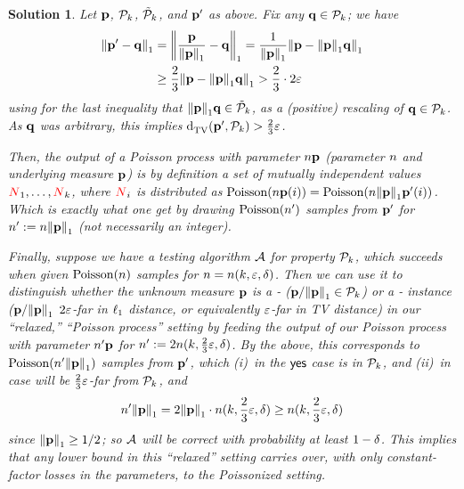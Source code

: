 \documentclass[biber,plain]{nowfnt} %
\newtheorem{solution}{Solution}[chapter]
\newcommand{\occur}{\textcolor{red}{N}}
\newcommand{\occur}{N}
\begin{document}
\begin{solution}
Let $\p$, $\property_\ab$, $\tilde{\property}_\ab$, and $\p'$ as above. Fix any $\q\in \property_\ab$; we have
\begin{align*}
\normone{\p' - \q}
&= \normone{\frac{\p}{\normone{\p}} - \q} 
= \frac{1}{\normone{\p}}\normone{\p - \normone{\p}\q} \\
&\geq \frac{2}{3}\normone{\p - \normone{\p}\q} > \frac{2}{3}\cdot 2\dst
\end{align*}
using for the last inequality that $\normone{\p}\q \in \tilde{\property}_\ab$, as a (positive) rescaling of $\q\in \property_\ab$. As $\q$ was arbitrary, this implies $\totalvardist{\p'}{\property_\ab} > \frac{2}{3}\dst$.

Then, the output of a Poisson process with parameter $\ns\p$ (\ie parameter $\ns$ and underlying measure $\p$) is by definition a set of mutually independent values $\occur_1,\dots, \occur_\ab$, where $\occur_i$ is distributed as $\poisson{\ns\p(i)} = \poisson{\ns\normone{\p}\p'(i)}$. Which is exactly what one get by drawing $\poisson{\ns'}$ \iid samples from $\p'$ for $\ns'\eqdef \ns\normone{\p}$ (not necessarily an integer).

Finally, suppose we have a testing algorithm $\Algo$ for property $\property_\ab$, which succeeds when given $\poisson{\ns}$ samples for $\ns=\ns(\ab, \dst, \errprob)$. Then we can use it to distinguish whether the unknown measure $\p$ is a  \yes- ($\p/\normone{\p}\in \property_\ab$) or a \no- instance ($\p/\normone{\p}$ $2\dst$-far in $\lp[1]$ distance, or equivalently $\dst$-far in TV distance) in our ``relaxed,'' ``Poisson process'' setting by feeding the output of our Poisson process with parameter $\ns'\p$ for $\ns' \eqdef 2\ns(\ab, \frac{2}{3}\dst, \errprob)$. By the above, this corresponds to $\poisson{\ns'\normone{\p}}$ samples from $\p'$, which (i)~in the $\yes$ case is in $\property_\ab$, and (ii)~in \no case will be $\frac{2}{3}\dst$-far from $\property_\ab$, and
\[
	\ns'\normone{\p} = 2\normone{\p} \cdot \ns(\ab, \frac{2}{3}\dst, \errprob) \geq \ns(\ab, \frac{2}{3}\dst, \errprob)
\]
since $\normone{\p} \geq 1/2$; so $\Algo$ will be correct with probability at least $1-\errprob$. This implies that any lower bound in this ``relaxed'' setting carries over, with only constant-factor losses in the parameters, to the Poissonized setting.
\end{solution}
\end{document}
